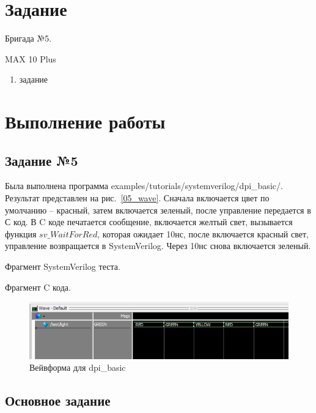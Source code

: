 \documentclass[a4paper,14pt]{article}
\begin{document}
    
    \tableofcontents
    \pagebreak


    \section{Задание}

    Бригада №5.
    
    MAX 10 Plus

    \begin{enumerate}
        \item задание
    \end{enumerate}


    \section{Выполнение работы}

    \subsection{Задание №5}

    Была выполнена программа examples/tutorials/systemverilog/dpi_basic/.
    Результат представлен на рис.~\ref{05_wave}.
    Сначала включается цвет по умолчанию -- красный, затем включается зеленый, после управление передается в С код.
    В C коде печатается сообщение, включается желтый свет, вызывается функция $sv\_WaitForRed$, которая ожидает 10нс, 
    после включается красный свет, управление возвращается в SystemVerilog.
    Через 10нс снова включается зеленый.

    Фрагмент SystemVerilog теста.
    {\small {}}

    Фрагмент C кода.
    {\small {}}

    \begin{figure}[H]
        \centering
        \includegraphics[width=\linewidth]{images/05_wave}
        \caption{Вейвформа для dpi_basic}
        \label{fig:05_wave}
    \end{figure}
    
	\subsection{Основное задание}
	
\end{document}
